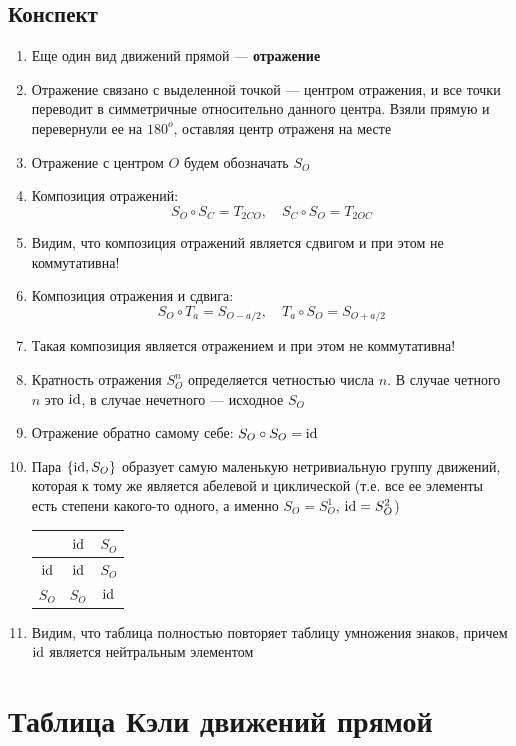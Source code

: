 \subsection{Конспект}
\begin{enumerate}\setlength{\itemsep}{1pt}
\item Еще один вид движений прямой --- \textbf{отражение}
\item Отражение связано с выделенной точкой --- центром отражения, и все точки переводит в симметричные относительно данного центра. Взяли прямую и перевернули ее на $180^o$, оставляя центр отраженя на месте
\item Отражение с центром $O$ будем обозначать $S_O$
\item Композиция отражений: $$S_O\circ S_C=T_{2CO},\quad S_C\circ S_O=T_{2OC}$$
\item Видим, что композиция отражений является сдвигом и при этом не коммутативна!
\item Композиция отражения и сдвига: $$S_O\circ T_a = S_{O-a/2},\quad T_a\circ S_O = S_{O+a/2}$$
\item Такая композиция является отражением и при этом не коммутативна!
\item Кратность отражения $S_O^n$ определяется четностью числа $n$. В случае четного $n$ это $\mathrm{id}$, в случае нечетного --- исходное $S_O$
\item Отражение обратно самому себе: $S_O\circ S_O=\mathrm{id}$
\item Пара $\{\mathrm{id}, S_O\}$ образует самую маленькую нетривиальную группу движений, которая к тому же является абелевой и циклической (т.е. все ее элементы есть степени какого-то одного, а именно $S_O=S_O^1$, $\mathrm{id}=S_O^2$)
\begin{table}[htb!]\begin{center}
\begin{tabular}{c|c|c|}
  & $\mathrm{id}$ & $S_O$ \\
 \hline
$\mathrm{id}$ & $\mathrm{id}$ & $S_O$ \\
 \hline
$S_O$ & $S_O$ & $\mathrm{id}$ \\
\hline
\end{tabular}
\end{center}\end{table}
\item Видим, что таблица полностью повторяет таблицу умножения знаков, причем $\mathrm{id}$ является нейтральным элементом
\end{enumerate}



\section{Таблица Кэли движений прямой}

